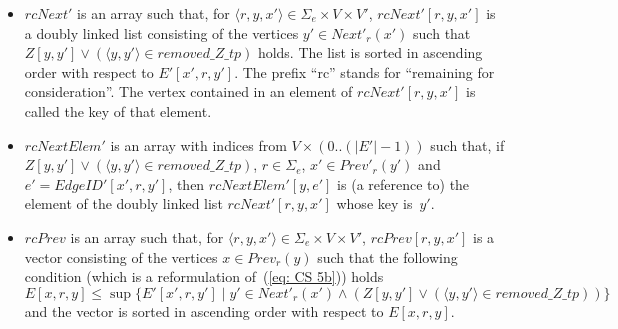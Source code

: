 \documentclass[11pt]{article}
\def\tuple#1{\langle#1\rangle}
\def\eqref#1{(\ref{#1})}
\newcommand{\SE}{\Sigma_e}
\newcommand{\Prev}{\mathit{Prev}}
\newcommand{\NextP}{\mathit{Next}'}
\newcommand{\PrevP}{\mathit{Prev}'}
\newcommand{\removeZ}{\textit{removed\_Z\_tp}}
\newcommand{\EdgeIDp}{\mathit{EdgeID}'}
\newcommand{\rcNextP}{\mathit{rcNext}'}
\newcommand{\rcPrev}{\mathit{rcPrev}}
\newcommand{\rcNextElemP}{\mathit{rcNextElem}'}
\begin{document}
\begin{itemize}
\item $\rcNextP$ is an array such that, for $\tuple{r,y,x'} \in \SE \times V \times V'$, $\rcNextP[r,y,x']$ is a doubly linked list consisting of the vertices $y' \in \NextP_r(x')$ such that $Z[y,y'] \lor (\tuple{y,y'} \in \removeZ)$ holds. The list is sorted in ascending order with respect to $E'[x',r,y']$. The prefix ``rc'' stands for ``remaining for consideration''. The vertex contained in an element of $\rcNextP[r,y,x']$ is called the key of that element. 

\item $\rcNextElemP$ is an array with indices from $V \times (0..(|E'|-1))$ such that, if $Z[y,y'] \lor (\tuple{y,y'} \in \removeZ)$, $r \in \SE$, $x' \in \PrevP_r(y')$ and $e' = \EdgeIDp[x',r,y']$, then $\rcNextElemP[y,e']$ is (a reference to) the element of the doubly linked list $\rcNextP[r,y,x']$ whose key is~$y'$. 

\item $\rcPrev$ is an array such that, for $\tuple{r,y,x'} \in \SE \times V \times V'$, $\rcPrev[r,y,x']$ is a vector consisting of the vertices $x \in \Prev_r(y)$ such that the following condition (which is a reformulation of~\eqref{eq: CS 5b}) holds 
\begin{equation}
	E[x,r,y] \leq \sup \{E'[x',r,y'] \mid y' \in \NextP_r(x') \land (Z[y,y'] \lor (\tuple{y,y'} \in \removeZ))\} \label{eq: CS 7}
\end{equation}
and the vector is sorted in ascending order with respect to $E[x,r,y]$. 
\end{itemize}
\end{document}
